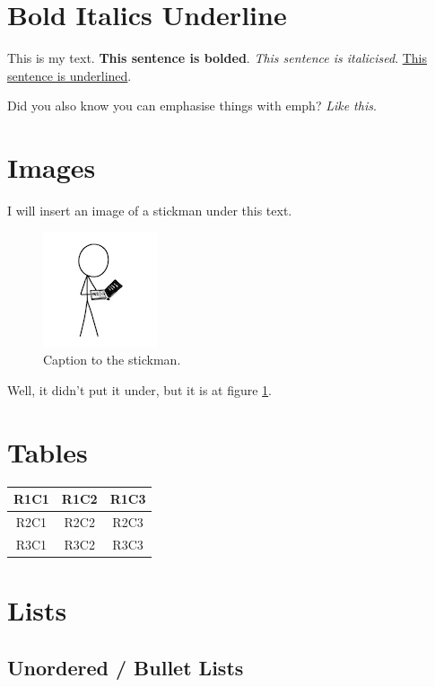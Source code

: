 \documentclass[12pt, a4paper]{article}
\begin{document}
    \section{Bold Italics Underline}

    This is my text. \textbf{This sentence is bolded}. \textit{This sentence is italicised}. \underline{This sentence is underlined}. \newline

    Did you also know you can emphasise things with emph? \emph{Like this}.

    \section{Images}

    I will insert an image of a stickman under this text.

    \begin{figure}
        \centering
        \includegraphics{profile}
        \caption{Caption to the stickman.}
        \label{fig:stickman}
    \end{figure}

    Well, it didn't put it under, but it is at figure \ref{fig:stickman}.

    \section{Tables}

    \begin{tabular}{|c|c|c|}
        \hline
        R1C1 & R1C2 & R1C3 \\
        \hline
        R2C1 & R2C2 & R2C3 \\
        \hline
        R3C1 & R3C2 & R3C3 \\ [0pt]
        \hline
    \end{tabular}

    \section{Lists}

    \subsection{Unordered / Bullet Lists}
\end{document}

